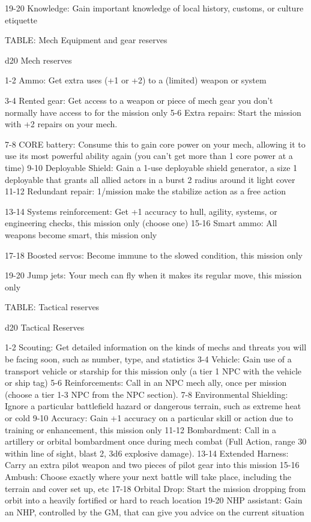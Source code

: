    19-20   Knowledge: Gain important knowledge of local history, customs, or culture etiquette

TABLE: Mech Equipment and gear reserves

 d20       Mech	reserves

  1-2      Ammo: Get extra uses (+1 or +2) to a (limited) weapon or system

  3-4      Rented gear: Get access to a weapon or piece of mech gear you don’t normally have
           access to for the mission only
  5-6      Extra repairs: Start the mission with +2 repairs on your mech.

  7-8      CORE battery: Consume this to gain core power on your mech, allowing it to use its
           most powerful ability again (you can’t get more than 1 core power at a time)
 9-10      Deployable Shield: Gain a 1-use deployable shield generator, a size 1 deployable that
           grants all allied actors in a burst 2 radius around it light cover
   11-12   Redundant repair: 1/mission make the stabilize action as a free action

   13-14   Systems reinforcement: Get +1 accuracy to hull, agility, systems, or engineering
           checks, this mission only (choose one)
   15-16   Smart ammo: All weapons become smart, this mission only

   17-18   Boosted servos: Become immune to the slowed condition, this mission only

   19-20   Jump jets: Your mech can fly when it makes its regular move, this mission only

TABLE: Tactical reserves




 d20       Tactical	Reserves

 1-2       Scouting: Get detailed information on the kinds of mechs and threats you will be
           facing soon, such as number, type, and statistics
 3-4       Vehicle: Gain use of a transport vehicle or starship for this mission only (a tier 1 NPC
           with the vehicle or ship tag)
 5-6       Reinforcements: Call in an NPC mech ally, once per mission (choose a tier 1-3 NPC
           from the NPC section).
 7-8       Environmental Shielding: Ignore a particular battlefield hazard or dangerous terrain,
           such as extreme heat or cold
 9-10      Accuracy: Gain +1 accuracy on a particular skill or action due to training or
           enhancement, this mission only
 11-12     Bombardment: Call in a artillery or orbital bombardment once during mech combat
           (Full Action, range 30 within line of sight, blast 2, 3d6 explosive damage).
 13-14     Extended Harness: Carry an extra pilot weapon and two pieces of pilot gear into this
           mission
 15-16     Ambush: Choose exactly where your next battle will take place, including the terrain
           and cover set up, etc
 17-18     Orbital Drop: Start the mission dropping from orbit into a heavily fortified or hard to
           reach location
 19-20     NHP assistant: Gain an NHP, controlled by the GM, that can give you advice on the
           current situation

